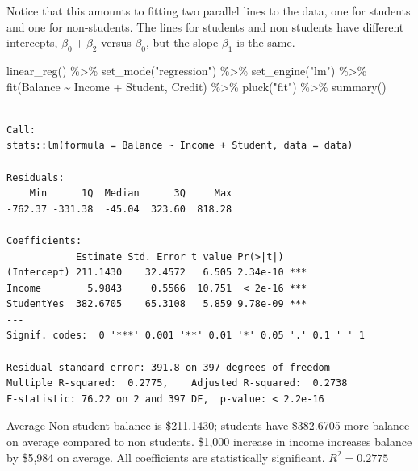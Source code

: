 \documentclass[
  letterpaper,
  DIV=11,
  numbers=noendperiod]{scrreprt}
\newenvironment{Shaded}{\begin{snugshade}}{\end{snugshade}}
\newcommand{\FunctionTok}[1]{\textcolor[rgb]{0.02,0.16,0.49}{#1}}
\newcommand{\NormalTok}[1]{\textcolor[rgb]{0.33,0.33,0.33}{#1}}
\newcommand{\SpecialCharTok}[1]{\textcolor[rgb]{0.00,0.46,0.62}{#1}}
\newcommand{\StringTok}[1]{\textcolor[rgb]{0.00,0.50,0.00}{#1}}
\begin{document}
Notice that this amounts to fitting two parallel lines to the data, one
for students and one for non-students. The lines for students and non
students have different intercepts, \(\beta_0 + \beta_2\) versus
\(\beta_0\), but the slope \(\beta_1\) is the same.

\begin{Shaded}
\begin{Highlighting}[]
\FunctionTok{linear\_reg}\NormalTok{() }\SpecialCharTok{\%\textgreater{}\%} 
  \FunctionTok{set\_mode}\NormalTok{(}\StringTok{"regression"}\NormalTok{) }\SpecialCharTok{\%\textgreater{}\%} 
  \FunctionTok{set\_engine}\NormalTok{(}\StringTok{"lm"}\NormalTok{) }\SpecialCharTok{\%\textgreater{}\%} 
  \FunctionTok{fit}\NormalTok{(Balance }\SpecialCharTok{\textasciitilde{}}\NormalTok{ Income }\SpecialCharTok{+}\NormalTok{ Student, Credit) }\SpecialCharTok{\%\textgreater{}\%} 
  \FunctionTok{pluck}\NormalTok{(}\StringTok{"fit"}\NormalTok{) }\SpecialCharTok{\%\textgreater{}\%} 
  \FunctionTok{summary}\NormalTok{()}
\end{Highlighting}
\end{Shaded}

\begin{verbatim}

Call:
stats::lm(formula = Balance ~ Income + Student, data = data)

Residuals:
    Min      1Q  Median      3Q     Max 
-762.37 -331.38  -45.04  323.60  818.28 

Coefficients:
            Estimate Std. Error t value Pr(>|t|)    
(Intercept) 211.1430    32.4572   6.505 2.34e-10 ***
Income        5.9843     0.5566  10.751  < 2e-16 ***
StudentYes  382.6705    65.3108   5.859 9.78e-09 ***
---
Signif. codes:  0 '***' 0.001 '**' 0.01 '*' 0.05 '.' 0.1 ' ' 1

Residual standard error: 391.8 on 397 degrees of freedom
Multiple R-squared:  0.2775,    Adjusted R-squared:  0.2738 
F-statistic: 76.22 on 2 and 397 DF,  p-value: < 2.2e-16
\end{verbatim}

Average Non student balance is \$211.1430; students have \$382.6705 more
balance on average compared to non students. \$1,000 increase in income
increases balance by \$5,984 on average. All coefficients are
statistically significant. \(R^2 = 0.2775\)
\end{document}
